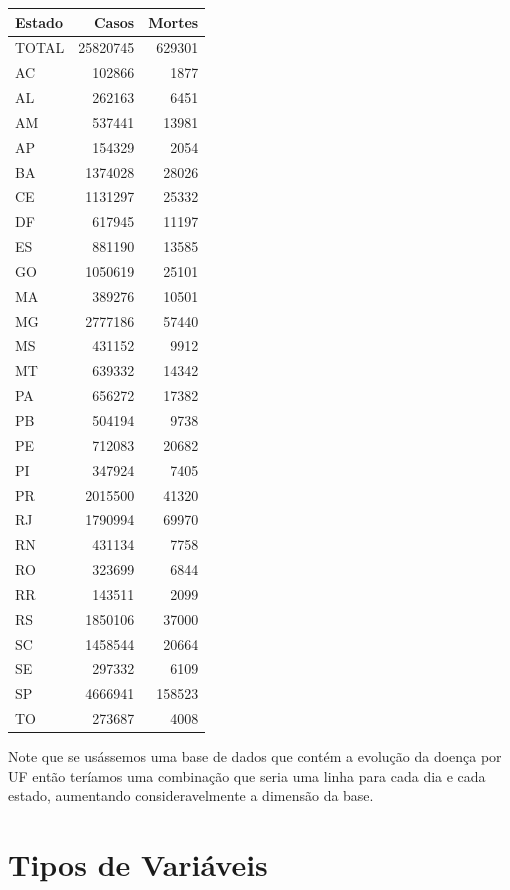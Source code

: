 \documentclass[
]{book}
\begin{document}
\begin{tabular}{l|r|r}
\hline
Estado & Casos & Mortes\\
\hline
TOTAL & 25820745 & 629301\\
\hline
AC & 102866 & 1877\\
\hline
AL & 262163 & 6451\\
\hline
AM & 537441 & 13981\\
\hline
AP & 154329 & 2054\\
\hline
BA & 1374028 & 28026\\
\hline
CE & 1131297 & 25332\\
\hline
DF & 617945 & 11197\\
\hline
ES & 881190 & 13585\\
\hline
GO & 1050619 & 25101\\
\hline
MA & 389276 & 10501\\
\hline
MG & 2777186 & 57440\\
\hline
MS & 431152 & 9912\\
\hline
MT & 639332 & 14342\\
\hline
PA & 656272 & 17382\\
\hline
PB & 504194 & 9738\\
\hline
PE & 712083 & 20682\\
\hline
PI & 347924 & 7405\\
\hline
PR & 2015500 & 41320\\
\hline
RJ & 1790994 & 69970\\
\hline
RN & 431134 & 7758\\
\hline
RO & 323699 & 6844\\
\hline
RR & 143511 & 2099\\
\hline
RS & 1850106 & 37000\\
\hline
SC & 1458544 & 20664\\
\hline
SE & 297332 & 6109\\
\hline
SP & 4666941 & 158523\\
\hline
TO & 273687 & 4008\\
\hline
\end{tabular}

Note que se usássemos uma base de dados que contém a evolução da doença por UF então teríamos uma combinação que seria uma linha para cada dia e cada estado, aumentando consideravelmente a dimensão da base.

\hypertarget{tipos-de-variuxe1veis}{%
\section{Tipos de Variáveis}\label{tipos-de-variuxe1veis}}
\end{document}
